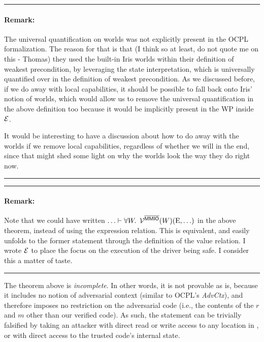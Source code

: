 \documentclass{article}
\newcommand{\X}[1]{\ensuremath{\mathrm{#1}}}
\newcommand{\MMIO}{\textlog{MMIO}\xspace}
\newenvironment{remark}
{ \bigskip\hrule\vspace{-1.3em}\nobreak
  \paragraph*{Remark:}}
{\vspace*{0.5em}\hrule\medskip}
\begin{document}
\begin{remark}
The universal quantification on worlds was not explicitly present in the OCPL
formalization.
The reason for that is that (I think so at least, do not quote me
on this - Thomas) they
used the built-in Iris worlds within their definition of weakest precondition,
by leveraging the state interpretation, which is universally quantified over in
the definition of weakest precondition.
As we discussed before, if we do away
with local capabilities, it should be possible to fall back onto Iris' notion of
worlds, which would allow us to remove the universal quantification in the
above definition too because it would be implicitly present in the WP inside $\mathcal{E}$.

It would be interesting to have a discussion about how to do away with the
worlds if we remove local capabilities, regardless of whether we will in the
end, since that might shed some light on why the worlds look the way they do
right now.
\end{remark}

\begin{remark}
  Note that we could have written
  $\ldots \vdash \forall W \ldotp \; \VR^{\notMMIO} (W) (\X{E}, \ldots)$
  in the above theorem, instead of using the expression relation. This is
  equivalent, and easily unfolds to the former statement through the definition
  of the value relation. I wrote $\mathcal{E}$ to place the focus on the execution of
  the driver being safe. I consider this a matter of taste.
\end{remark}

\medskip

The theorem above is \emph{incomplete}. In other words, it is not provable as
is, because it includes no notion of adversarial context (similar to OCPL's
\textit{AdvCtx}), and therefore imposes no restriction on the adversarial code
(i.e., the contents of the $r$ and $m$ other than our verified code).
%
As such, the statement can be trivially falsified by taking an attacker with
direct read or write access to any location in \MMIO, or with direct access to
the trusted code's internal state.
\end{document}
